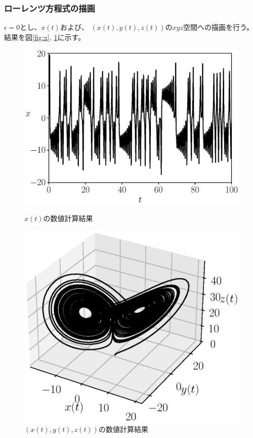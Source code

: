 \documentclass[a4j, titlepage]{jsarticle}
\numberwithin{equation}{section}
\begin{document}
        \subsubsection{ローレンツ方程式の描画}
            $\epsilon = 0$とし、$x(t)$および、
            $(x(t), y(t), z(t))$の$xyz$空間への描画を行う。
            結果を図\ref{fig:x}, \ref{fig:xyz}に示す。
            \begin{figure}[h]
                \begin{minipage}{0.49\hsize}
                    \centering
                    \includegraphics[width=1\hsize]{kadai7/x.eps}
                    \caption{
                        $x(t)$の数値計算結果
                    }
                    \label{fig:x}
                \end{minipage}
                \begin{minipage}{0.49\hsize}
                    \centering
                    \includegraphics[width=1\hsize]{kadai7/xyz.eps}
                    \caption{
                        $(x(t), y(t), z(t))$の数値計算結果
                    }
                    \label{fig:xyz}
                \end{minipage}
            \end{figure}
\end{document}
